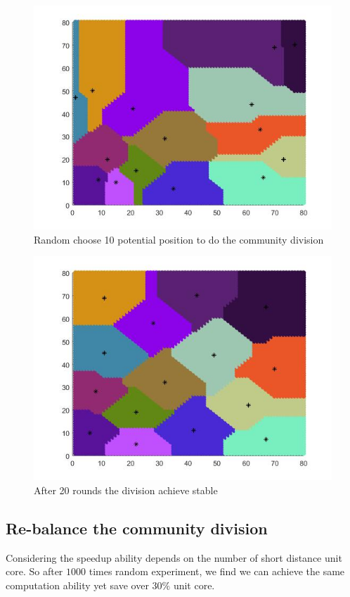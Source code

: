 \begin{figure}[h]
\centering\includegraphics[width=0.8\linewidth]{figure/cvt1}
\caption{Random choose 10 potential position to do the community division }
\label{cvt1}
\end{figure}

\begin{figure}[h]
\centering\includegraphics[width=0.8\linewidth]{figure/cvt20}
\caption{After 20 rounds the division achieve stable}
\label{cvt20}
\end{figure}

\subsection{Re-balance the community division }

Considering the speedup ability depends on the number of short distance unit core.
So after $1000$ times random experiment, we find we can achieve the same computation ability yet save over $30\%$ unit core.

